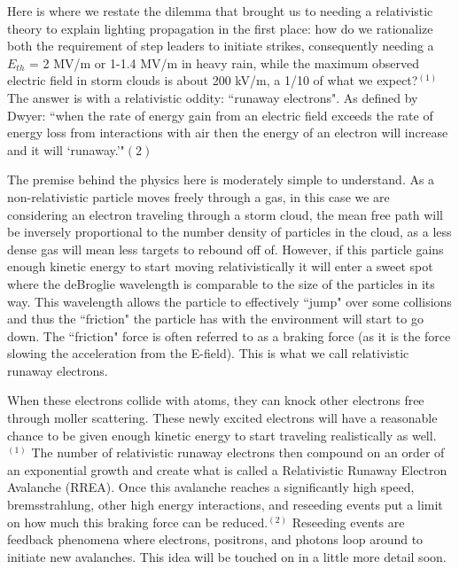 \documentclass[11pt]{article}
\begin{document}
\begin{multicols*}{2}
    Here is where we restate the dilemma that brought us to needing a relativistic theory to explain lighting propagation in the first place: how do we rationalize both the requirement of step leaders to initiate strikes, consequently needing a $E_{th}$ = 2 MV/m or 1-1.4 MV/m in heavy rain, while the maximum observed electric field in storm clouds is about 200 kV/m, a 1/10 of what we expect?$^{(1)}$ The answer is with a relativistic oddity: ``runaway electrons". As defined by Dwyer: ``when the rate of energy gain from an electric field exceeds the rate of energy loss from interactions with air then the energy of an electron will increase and it will `runaway.'"${(2)}$ 
    
    The premise behind the physics here is moderately simple to understand. As a non-relativistic particle moves freely through a gas, in this case we are considering an electron traveling through a storm cloud, the mean free path will be inversely proportional to the number density of particles in the cloud, as a less dense gas will mean less targets to rebound off of. However, if this particle gains enough kinetic energy to start moving relativistically it will enter a sweet spot where the deBroglie wavelength is comparable to the size of the particles in its way. This wavelength allows the particle to effectively ``jump" over some collisions and thus the ``friction" the particle has with the environment will start to go down. The ``friction" force is often referred to as a braking force (as it is the force slowing the acceleration from the E-field). This is what we call relativistic runaway electrons. 
    
    When these electrons collide with atoms, they can knock other electrons free through moller scattering. These newly excited electrons will have a reasonable chance to be given enough kinetic energy to start traveling realistically as well.$^{(1)}$ The number of relativistic runaway electrons then compound on an order of an exponential growth and create what is called a Relativistic Runaway Electron Avalanche (RREA). Once this avalanche reaches a significantly high speed, bremsstrahlung, other high energy interactions, and reseeding events put a limit on how much this braking force can be reduced.$^{(2)}$ Reseeding events are feedback phenomena where electrons, positrons, and photons loop around to initiate new avalanches. This idea will be touched on in a little more detail soon.
    

\end{multicols*}
\end{document}
